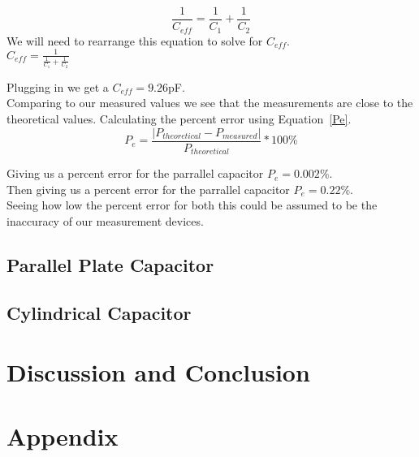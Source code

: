 \documentclass[10pt]{article}
\begin{document}
\begin{equation}\label{PCC}
  \frac{1}{C_{eff}} = \frac{1}{C_{1}} + \frac{1}{C_{2}}
\end{equation}
We will need to rearrange this equation to solve for $C_{eff}$.\\
$C_{eff} = \frac{1}{\frac{1}{C_{1}} + \frac{1}{C_{2}}}$

Plugging in we get a $C_{eff} = 9.26$pF.\\

Comparing to our measured values we see that the
measurements are close to the theoretical values.
Calculating the percent error using Equation~\ref*{Pe}.\\

\begin{equation}\label{Pe}
  P_{e} = \frac{|P_{theoretical} - P_{measured}|}{P_{theoretical}} * 100 \%
\end{equation}

Giving us a percent error for the parrallel capacitor $P_{e} = 0.002\%$.\\
Then giving us a percent error for the parrallel capacitor $P_{e} = 0.22\%$.\\
Seeing how low the percent error for both this could be assumed to be the inaccuracy of our
measurement devices.\\

\subsection*{Parallel Plate Capacitor}



\subsection*{Cylindrical Capacitor}






\section{Discussion and Conclusion}


\section*{Appendix}\newpage



\end{document}
